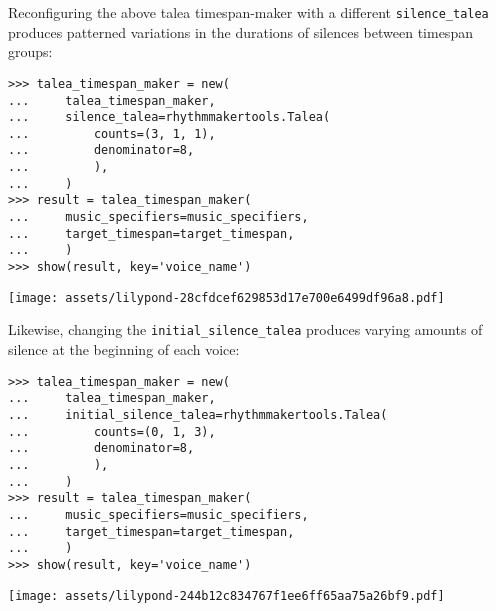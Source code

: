 \noindent Reconfiguring the above talea timespan-maker with a different
\texttt{silence\_talea} produces patterned variations in the durations of
silences between timespan groups:

\begin{comment}
<abjad>
talea_timespan_maker = new(
    talea_timespan_maker,
    silence_talea=rhythmmakertools.Talea(
        counts=(3, 1, 1),
        denominator=8,
        ),
    )
result = talea_timespan_maker(
    music_specifiers=music_specifiers,
    target_timespan=target_timespan,
    )
show(result, key='voice_name')
</abjad>
\end{comment}

\begin{abjadbookoutput}
\begin{singlespacing}
\vspace{-0.5\baselineskip}
\begin{verbatim}
>>> talea_timespan_maker = new(
...     talea_timespan_maker,
...     silence_talea=rhythmmakertools.Talea(
...         counts=(3, 1, 1),
...         denominator=8,
...         ),
...     )
>>> result = talea_timespan_maker(
...     music_specifiers=music_specifiers,
...     target_timespan=target_timespan,
...     )
>>> show(result, key='voice_name')
\end{verbatim}
\noindent\texttt{[image: assets/lilypond-28cfdcef629853d17e700e6499df96a8.pdf]}
\end{singlespacing}
\end{abjadbookoutput}

\noindent Likewise, changing the \texttt{initial\_silence\_talea} produces
varying amounts of silence at the beginning of each voice:

\begin{comment}
<abjad>
talea_timespan_maker = new(
    talea_timespan_maker,
    initial_silence_talea=rhythmmakertools.Talea(
        counts=(0, 1, 3),
        denominator=8,
        ),
    )
result = talea_timespan_maker(
    music_specifiers=music_specifiers,
    target_timespan=target_timespan,
    )
show(result, key='voice_name')
</abjad>
\end{comment}

\begin{abjadbookoutput}
\begin{singlespacing}
\vspace{-0.5\baselineskip}
\begin{verbatim}
>>> talea_timespan_maker = new(
...     talea_timespan_maker,
...     initial_silence_talea=rhythmmakertools.Talea(
...         counts=(0, 1, 3),
...         denominator=8,
...         ),
...     )
>>> result = talea_timespan_maker(
...     music_specifiers=music_specifiers,
...     target_timespan=target_timespan,
...     )
>>> show(result, key='voice_name')
\end{verbatim}
\noindent\texttt{[image: assets/lilypond-244b12c834767f1ee6ff65aa75a26bf9.pdf]}
\end{singlespacing}
\end{abjadbookoutput}

